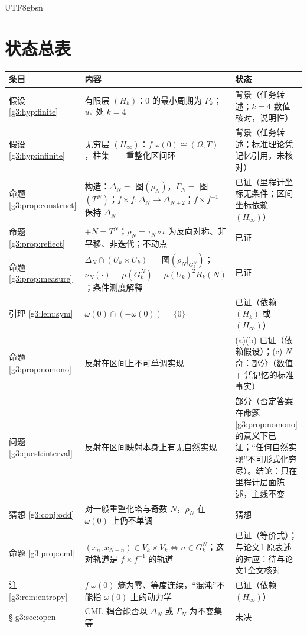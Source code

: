 \documentclass[11pt,a4paper]{article}
\newcommand{\Haar}{\mu}
\newcommand{\Om}{\Omega}               %
\newcommand{\ust}{u_{*}}
\theoremstyle{plain}
\theoremstyle{definition}
\begin{document}
\begin{CJK}{UTF8}{gbsn}
\section*{状态总表}
\begin{center}
\begin{tabular}{p{2.6cm}p{7.6cm}p{4.2cm}}
\hline
条目 & 内容 & 状态\\
\hline
假设 \ref{g3:hyp:finite} & 有限层 $(H_k)$：$0$ 的最小周期为 $P_k$；$\ust$ 处 $k=4$ & 背景（任务转述；$k=4$ 数值核对，说明性）\\
假设 \ref{g3:hyp:infinite} & 无穷层 $(H_\infty)$：$f|\omega(0)\cong(\Om,T)$，柱集 $=$ 重整化区间环 & 背景（任务转述；标准理论凭记忆引用，未核对）\\
命题 \ref{g3:prop:construct} & 构造：$\Delta_N=$ 图$(\rho_N)$，$\Gamma_N=$ 图$(T^N)$；$f\times f:\Delta_N\to\Delta_{N+2}$；$f\times f^{-1}$ 保持 $\Delta_N$ & 已证（里程计坐标无条件；区间坐标依赖 $(H_\infty)$）\\
命题 \ref{g3:prop:reflect} & $+N=T^N$；$\rho_N=\tau_N\circ\iota$ 为反向对称、非平移、非迭代；不动点 & 已证\\
命题 \ref{g3:prop:measure} & $\Delta_N\cap(U_k\times U_k)=$ 图$(\rho_N|_{G_k^N})$；$\nu_N(\cdot)=\Haar(G_k^N)=\Haar(U_k)^2R_k(N)$；条件测度解释 & 已证\\
引理 \ref{g3:lem:sym} & $\omega(0)\cap(-\omega(0))=\{0\}$ & 已证（依赖 $(H_k)$ 或 $(H_\infty)$）\\
命题 \ref{g3:prop:nomono} & 反射在区间上不可单调实现 & (a)(b) 已证（依赖假设）；(c) $N$ 奇：部分（数值 $+$ 凭记忆的标准事实）\\
问题 \ref{g3:quest:interval} & 反射在区间映射本身上有无自然实现 & 部分（否定答案在命题 \ref{g3:prop:nomono} 的意义下已证；“任何自然实现”不可形式化穷尽）。结论：只在里程计层面陈述，主线不变\\
猜想 \ref{g3:conj:odd} & 对一般重整化塔与奇数 $N$，$\rho_N$ 在 $\omega(0)$ 上仍不单调 & 猜想\\
命题 \ref{g3:prop:cml} & $(x_n,x_{N-n})\in V_k\times V_k\iff n\in G_k^N$；这对轨道是 $f\times f^{-1}$ 的轨道 & 已证（等价式）；与论文1 原表述的对应：待与论文1全文核对\\
注 \ref{g3:rem:entropy} & $f|\omega(0)$ 熵为零、等度连续，“混沌”不能指 $\omega(0)$ 上的动力学 & 已证（依赖 $(H_\infty)$）\\
\S\ref{g3:sec:open} & CML 耦合能否以 $\Delta_N$ 或 $\Gamma_N$ 为不变集等 & 未决\\
\hline
\end{tabular}
\end{center}


\end{CJK}
\end{document}
